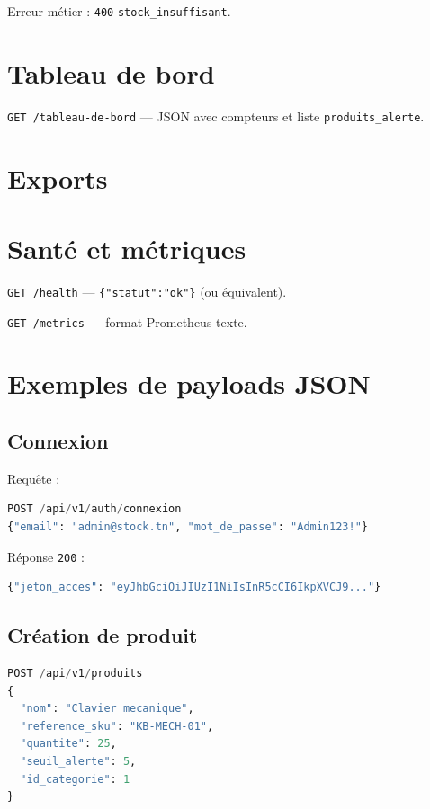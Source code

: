 Erreur métier : \texttt{400} \texttt{stock\_insuffisant}.

\section{Tableau de bord}

\texttt{GET /tableau-de-bord} — JSON avec compteurs et liste \texttt{produits\_alerte}.

\section{Exports}


\section{Santé et métriques}

\texttt{GET /health} — \texttt{\{"statut":"ok"\}} (ou équivalent).

\texttt{GET /metrics} — format Prometheus texte.

\section{Exemples de payloads JSON}

\subsection{Connexion}

Requête :
\begin{lstlisting}[language=Python]
POST /api/v1/auth/connexion
{"email": "admin@stock.tn", "mot_de_passe": "Admin123!"}
\end{lstlisting}

Réponse \texttt{200} :
\begin{lstlisting}[language=Python]
{"jeton_acces": "eyJhbGciOiJIUzI1NiIsInR5cCI6IkpXVCJ9..."}
\end{lstlisting}

\subsection{Création de produit}

\begin{lstlisting}[language=Python]
POST /api/v1/produits
{
  "nom": "Clavier mecanique",
  "reference_sku": "KB-MECH-01",
  "quantite": 25,
  "seuil_alerte": 5,
  "id_categorie": 1
}
\end{lstlisting}

